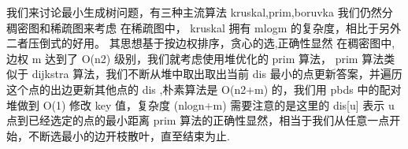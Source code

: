{}\markdownRendererSectionBegin
{}\markdownRendererInterblockSeparator
{}我们来讨论最小生成树问题，有三种主流算法\markdownRendererDollarSign{} kruskal,prim,boruvka \markdownRendererDollarSign{}\markdownRendererParagraphSeparator
{}我们仍然分稠密图和稀疏图来考虑\markdownRendererParagraphSeparator
{}在稀疏图中，\markdownRendererDollarSign{} kruskal \markdownRendererDollarSign{}拥有\markdownRendererDollarSign{} mlogm \markdownRendererDollarSign{}的复杂度，相比于另外二者压倒式的好用。\markdownRendererParagraphSeparator
{}其思想基于按边权排序，贪心的选,正确性显然\markdownRendererInterblockSeparator
{}\markdownRendererSectionBegin
{}\markdownRendererInterblockSeparator
{}\markdownRendererInterblockSeparator
{}在稠密图中,边权\markdownRendererDollarSign{} m\markdownRendererSoftLineBreak
{}\markdownRendererDollarSign{}达到了\markdownRendererDollarSign{} O(n\markdownRendererCircumflex{}2) \markdownRendererDollarSign{}级别，我们就考虑使用堆优化的\markdownRendererDollarSign{} prim \markdownRendererDollarSign{}算法，\markdownRendererDollarSign{} prim \markdownRendererDollarSign{}算法类似于\markdownRendererDollarSign{} dijkstra \markdownRendererDollarSign{}算法，我们不断从堆中取出取出当前\markdownRendererDollarSign{} dis \markdownRendererDollarSign{}最小的点更新答案，并遍历这个点的出边更新其他点的\markdownRendererDollarSign{} dis \markdownRendererDollarSign{},朴素算法是\markdownRendererDollarSign{} O(n\markdownRendererCircumflex{}2+m) \markdownRendererDollarSign{}的，我们用\markdownRendererDollarSign{} pbds \markdownRendererDollarSign{}中的配对堆做到\markdownRendererDollarSign{} O(1) \markdownRendererDollarSign{}修改\markdownRendererDollarSign{} key \markdownRendererDollarSign{}值，复杂度\markdownRendererDollarSign{} (nlogn+m) \markdownRendererDollarSign{} 需要注意的是这里的\markdownRendererDollarSign{} dis[u] \markdownRendererDollarSign{}表示\markdownRendererDollarSign{} u \markdownRendererDollarSign{}点到已经选定的点的最小距离\markdownRendererParagraphSeparator
{}\markdownRendererDollarSign{} prim \markdownRendererDollarSign{}算法的正确性显然，相当于我们从任意一点开始，不断选最小的边开枝散叶，直至结束为止.\markdownRendererInterblockSeparator
{}
\markdownRendererSectionEnd \markdownRendererSectionBegin
{}\markdownRendererInterblockSeparator
{}\markdownRendererInterblockSeparator
